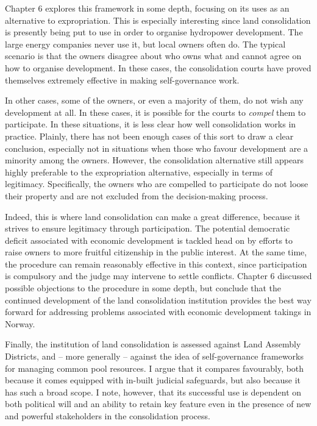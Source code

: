Chapter 6 explores this framework in some depth, focusing on its uses as an alternative to expropriation. This is especially interesting since land consolidation is presently being put to use in order to organise hydropower development. The large energy companies never use it, but local owners often do. The typical scenario is that the owners disagree about who owns what and cannot agree on how to organise development. In these cases, the consolidation courts have proved themselves extremely effective in making self-governance work.

In other cases, some of the owners, or even a majority of them, do not wish any development at all. In these cases, it is possible for the courts to {\it compel} them to participate. In these situations, it is less clear how well consolidation works in practice. Plainly, there has not been enough cases of this sort to draw a clear conclusion, especially not in situations when those who favour development are a minority among the owners. However, the consolidation alternative still appears highly preferable to the expropriation alternative, especially in terms of legitimacy. Specifically, the owners who are compelled to participate do not loose their property and are not excluded from the decision-making process.

Indeed, this is where land consolidation can make a great difference, because it strives to ensure legitimacy through participation. The potential democratic deficit associated with economic development is tackled head on by efforts to raise owners to more fruitful citizenship in the public interest. At the same time, the procedure can remain reasonably effective in this context, since participation is compulsory and the judge may intervene to settle conflicts. Chapter 6 discussed possible objections to the procedure in some depth, but conclude that the continued development of the land consolidation institution provides the best way forward for addressing problems associated with economic development takings in Norway.

Finally, the institution of land consolidation is assessed against Land Assembly Districts, and -- more generally -- against the idea of self-governance frameworks for managing common pool resources. I argue that it compares favourably, both because it comes equipped with in-built judicial safeguards, but also because it has such a broad scope. I note, however, that its successful use is dependent on both political will and an ability to retain key feature even in the presence of new and powerful stakeholders in the consolidation process.

